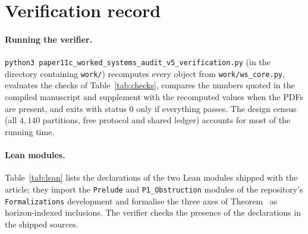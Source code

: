 \section{Verification record}\label{si:verification}

\paragraph{Running the verifier.}
\texttt{python3 paper11c\_worked\_systems\_audit\_v5\_verification.py} (in the directory containing \texttt{work/}) recomputes every object from \texttt{work/ws\_core.py}, evaluates the \NCHECKS{} checks of Table~\ref{tab:checks}, compares the numbers quoted in the compiled manuscript and supplement with the recomputed values when the PDFs are present, and exits with status $0$ only if everything passes. The design census (all $4{,}140$ partitions, free protocol and shared ledger) accounts for most of the running time.



\paragraph{Lean modules.}
Table~\ref{tab:lean} lists the declarations of the two Lean modules shipped with the article; they import the \texttt{Prelude} and \texttt{P1\_Obstruction} modules of the repository's \texttt{Formalizations} development and formalise the three axes of Theorem~ as horizon-indexed inclusions. The verifier checks the presence of the declarations in the shipped sources.


